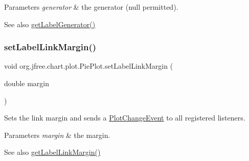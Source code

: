 \begin{DoxyParams}{Parameters}
{\em generator} & the generator ({\ttfamily null} permitted).\\
\hline
\end{DoxyParams}
\begin{DoxySeeAlso}{See also}
\mbox{\hyperlink{classorg_1_1jfree_1_1chart_1_1plot_1_1_pie_plot_a4468c4b622678866bd5fc13c1c2bca50}{get\+Label\+Generator()}} 
\end{DoxySeeAlso}
\mbox{\label{classorg_1_1jfree_1_1chart_1_1plot_1_1_pie_plot_a62c82b17fba28898ef0109e07774443a}} 
\subsubsection{\texorpdfstring{set\+Label\+Link\+Margin()}{setLabelLinkMargin()}}
{\footnotesize\ttfamily void org.\+jfree.\+chart.\+plot.\+Pie\+Plot.\+set\+Label\+Link\+Margin (\begin{DoxyParamCaption}\item[{double}]{margin }\end{DoxyParamCaption})}

Sets the link margin and sends a \mbox{\hyperlink{}{Plot\+Change\+Event}} to all registered listeners.


\begin{DoxyParams}{Parameters}
{\em margin} & the margin.\\
\hline
\end{DoxyParams}
\begin{DoxySeeAlso}{See also}
\mbox{\hyperlink{classorg_1_1jfree_1_1chart_1_1plot_1_1_pie_plot_a94034ed3c2584aba485d418db6217ac9}{get\+Label\+Link\+Margin()}} 
\end{DoxySeeAlso}
\mbox{\label{classorg_1_1jfree_1_1chart_1_1plot_1_1_pie_plot_a50d9df69250b68383bf036eb30e396cc}} 
